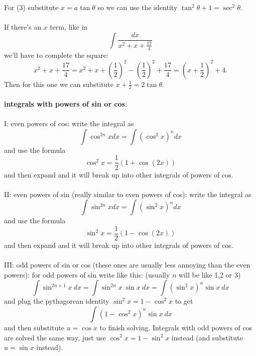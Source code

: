 \documentclass{article}
\begin{document}
For (3) substitute $x = a\tan\theta$ so we can use the identity $\tan^2\theta + 1 = \sec^2\theta$. \\ \\
If there's an $x$ term, like in
$$
\int \frac{dx}{x^2 + x +\frac{17}{4}}
$$
we'll have to complete the square:
$$
x^2+x+\frac{17}{4} = x^2+x+(\frac{1}{2})^2-(\frac{1}{2})^2 +\frac{17}{4} = (x+\frac{1}{2})^2 + 4.
$$
Then for this one we can substitute $x+\frac{1}{2} = 2\tan \theta$.  \\ \\
\textbf{integrals with powers of sin or cos}: \\ \\
I: even powers of cos: write the integral as 
$$
\int \cos^{2n} x dx = \int (\cos^2 x)^n dx
$$
and use the formula 
$$
\cos^2 x = \frac{1}{2}(1+\cos (2x))
$$
and then expand and it will break up into other integrals of powers of cos. \\ \\
II: even powers of sin (really similar to even powers of cos): write the integral as
$$
\int \sin^{2n}x dx = \int (\sin^2 x)^n dx
$$
and use the formula 
$$
\sin^2 x = \frac{1}{2}(1-\cos(2x))
$$
and then expand and it will break up into other integrals of powers of cos. \\ \\
III: odd powers of sin or cos (these ones are usually less annoying than the even powers):
for odd powers of sin write like this: (usually $n$ will be like 1,2 or 3)
$$
\int \sin^{2n+1} x\:dx = \int \sin^{2n}x \:\sin x \:dx = \int (\sin^2x)^n \sin x \:dx
$$
and plug the pythagorean identity $\sin^2x = 1-\cos^2x$ to get
$$
\int (1-\cos^2 x)^n \sin x \: dx
$$
and then substitute $u = \cos x$ to finish solving. Integrals with odd powers of cos are solved the same way, just use $\cos^2x = 1-\sin^2x$ instead (and substitute $u = \sin x$ instead). 
\end{document}
